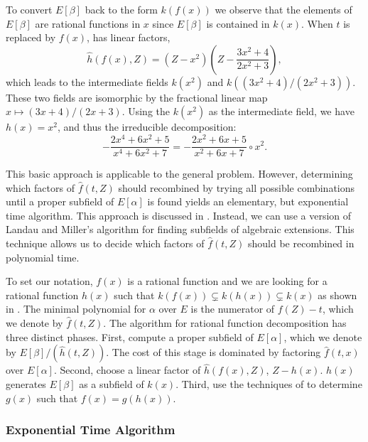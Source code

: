To convert $E[\beta]$ back to the form $k(f(x))$ we observe that the
elements of $E[\beta]$ are rational functions in $x$ since $E[\beta]$
is contained in $k(x)$.  When $t$ is replaced by $f(x)$,  has
linear factors, \viz
\[
\hat{h}(f(x), Z) = \left(Z - x^2\right)\left(Z - \frac{3x^2+4}{2x^2+3}\right),
\]
which leads to the intermediate fields $k(x^2)$ and
$k((3x^2+4)/(2x^2+3))$.  These two fields are isomorphic by the
fractional linear map $x \mapsto (3x+4)/(2x+3)$.  Using the $k(x^2)$ as the
intermediate field, we have $h(x) = x^2$, and thus the irreducible
decomposition:
\[
- \frac{2x^4 + 6 x^2 + 5}{x^4 + 6 x^2 + 7} = - \frac{2x^2 + 6 x + 5}{x^2 +
6 x + 7} \circ x^2.
\]

\medskip

This basic approach is applicable to the general problem.  However,
determining which factors of $\hat{f}(t, Z)$ should recombined by
trying all possible combinations until a proper subfield of
$E[\alpha]$ is found yields an elementary, but exponential time
algorithm.  This approach is discussed in
.  Instead, we can use a version of 
Landau and Miller's algorithm \cite{Landau85b} for
finding subfields of algebraic extensions.  This technique allows us
to decide which factors of $\hat{f}(t, Z)$ should be recombined in
polynomial time.

To set our notation, $f(x)$ is a rational function and we are looking for a
rational function $h(x)$ such that $k(f(x)) \varsubsetneq k(h(x))
\varsubsetneq k(x)$ as shown in .  The
minimal polynomial for $\alpha$ over $E$ is the numerator of $f(Z)- t$,
which we denote by $\hat{f}(t, Z)$.  The algorithm for rational function
decomposition has three distinct phases.  First, compute a proper subfield
of $E[\alpha]$, which we denote by $E[\beta]/(\hat{h}(t, Z))$.  The 
cost of this stage is dominated by factoring $\hat{f}(t, x)$ over $E[\alpha]$.
Second, choose a linear factor of $\hat{h}(f(x), Z)$, $Z - h(x)$.  $h(x)$
generates $E[\beta]$ as a subfield of $k(x)$.  Third, use the techniques of
 to determine $g(x)$ such that $f(x) = g(h(x))$.

\subsubsection{Exponential Time Algorithm}
\label{Exponential:Alg:Sec}

